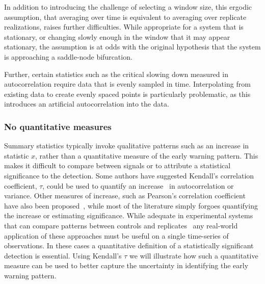 \documentclass[authoryear,review,11pt]{elsarticle}
\begin{document}
In addition to introducing the challenge of selecting a window size, 
this ergodic assumption, 
that averaging over time is equivalent to averaging over replicate realizations,  
raises further difficulties.  
While appropriate for a system that is stationary, 
or changing slowly enough in the window that it may appear stationary,
the assumption is at odds with the original hypothesis 
that the system is approaching a saddle-node bifurcation. 

Further, certain statistics such as the critical slowing down measured in autocorrelation 
require data that is evenly sampled in time.  
Interpolating from existing data to create evenly spaced points is particularly problematic,
as this introduces an artificial autocorrelation into the data.  

\subsubsection*{No quantitative measures}
Summary statistics typically invoke qualitative patterns such as an increase in statistic $x$, 
rather than a quantitative measure of the early warning pattern.  
This makes it difficult to compare between signals or to
attribute a statistical significance to the detection.
Some authors have suggested Kendall's correlation coefficient, 
$\tau$, could be used to quantify an increase~\citep{Dakos2008, Dakos20011} 
in autocorrelation or variance.  
Other measures of increase, such as Pearson's correlation coefficient have also been proposed~\citep{Drake2010},
while most of the literature simply forgoes quantifying the increase or estimating significance.  
While adequate in experimental systems that can compare patterns between controls and replicates~\citep[\emph{e.g.}][]{Drake2010, Carpenter2011}
any real-world application of these approaches must be useful on a single time-series of observations.
In these cases a quantitative definition of a statistically significant detection is essential. 
Using Kendall's $\tau$ we will illustrate how such a quantitative measure 
can be used to better capture the uncertainty in identifying the early warning pattern.  
\end{document}
